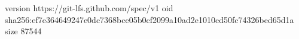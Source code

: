 version https://git-lfs.github.com/spec/v1
oid sha256:ef7e364649247e0dc7368bce05b0cf2099a10ad2e1010cd50fc74326bed65d1a
size 87544
